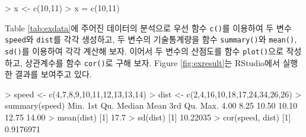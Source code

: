 \documentclass[
]{book}
\newenvironment{Shaded}{\begin{snugshade}}{\end{snugshade}}
\newcommand{\DecValTok}[1]{\textcolor[rgb]{0.00,0.00,0.81}{#1}}
\newcommand{\FloatTok}[1]{\textcolor[rgb]{0.00,0.00,0.81}{#1}}
\newcommand{\FunctionTok}[1]{\textcolor[rgb]{0.00,0.00,0.00}{#1}}
\newcommand{\NormalTok}[1]{#1}
\newcommand{\OtherTok}[1]{\textcolor[rgb]{0.56,0.35,0.01}{#1}}
\newcommand{\SpecialCharTok}[1]{\textcolor[rgb]{0.00,0.00,0.00}{#1}}
\begin{document}
\begin{Shaded}
\begin{Highlighting}[]
\SpecialCharTok{\textgreater{}}\NormalTok{ x }\OtherTok{\textless{}{-}} \FunctionTok{c}\NormalTok{(}\DecValTok{10}\NormalTok{,}\DecValTok{11}\NormalTok{)}
\SpecialCharTok{\textgreater{}}\NormalTok{ x }\OtherTok{=} \FunctionTok{c}\NormalTok{(}\DecValTok{10}\NormalTok{,}\DecValTok{11}\NormalTok{)}
\end{Highlighting}
\end{Shaded}

Table \ref{tab:exdata}에 주어진 데이터의 분석으로 우선 함수 \texttt{c()}를
이용하여 두 변수 \texttt{speed}와 \texttt{dist}를 각각 생성하고, 두 변수의 기술통계량을
함수 \texttt{summary()}와 \texttt{mean()}, \texttt{sd()}를 이용하여 각각 계산해 보자. 이어서
두 변수의 산점도를 함수 \texttt{plot()}으로 작성하고, 상관계수를 함수 \texttt{cor()}로
구해 보자. Figure \ref{fig:exresult}는 RStudio에서 실행한 결과를
보여주고 있다.

\begin{Shaded}
\begin{Highlighting}[]
\SpecialCharTok{\textgreater{}}\NormalTok{ speed }\OtherTok{\textless{}{-}} \FunctionTok{c}\NormalTok{(}\DecValTok{4}\NormalTok{,}\DecValTok{7}\NormalTok{,}\DecValTok{8}\NormalTok{,}\DecValTok{9}\NormalTok{,}\DecValTok{10}\NormalTok{,}\DecValTok{11}\NormalTok{,}\DecValTok{12}\NormalTok{,}\DecValTok{13}\NormalTok{,}\DecValTok{13}\NormalTok{,}\DecValTok{14}\NormalTok{)}
\SpecialCharTok{\textgreater{}}\NormalTok{ dist }\OtherTok{\textless{}{-}} \FunctionTok{c}\NormalTok{(}\DecValTok{2}\NormalTok{,}\DecValTok{4}\NormalTok{,}\DecValTok{16}\NormalTok{,}\DecValTok{10}\NormalTok{,}\DecValTok{18}\NormalTok{,}\DecValTok{17}\NormalTok{,}\DecValTok{24}\NormalTok{,}\DecValTok{34}\NormalTok{,}\DecValTok{26}\NormalTok{,}\DecValTok{26}\NormalTok{)}
\SpecialCharTok{\textgreater{}} \FunctionTok{summary}\NormalTok{(speed)}
\NormalTok{   Min. 1st Qu.  Median    Mean 3rd Qu.    Max. }
   \FloatTok{4.00}    \FloatTok{8.25}   \FloatTok{10.50}   \FloatTok{10.10}   \FloatTok{12.75}   \FloatTok{14.00} 
\SpecialCharTok{\textgreater{}} \FunctionTok{mean}\NormalTok{(dist)}
\NormalTok{[}\DecValTok{1}\NormalTok{] }\FloatTok{17.7}
\SpecialCharTok{\textgreater{}} \FunctionTok{sd}\NormalTok{(dist)}
\NormalTok{[}\DecValTok{1}\NormalTok{] }\FloatTok{10.22035}
\SpecialCharTok{\textgreater{}} \FunctionTok{cor}\NormalTok{(speed, dist)}
\NormalTok{[}\DecValTok{1}\NormalTok{] }\FloatTok{0.9176971}
\end{Highlighting}
\end{Shaded}
\end{document}
